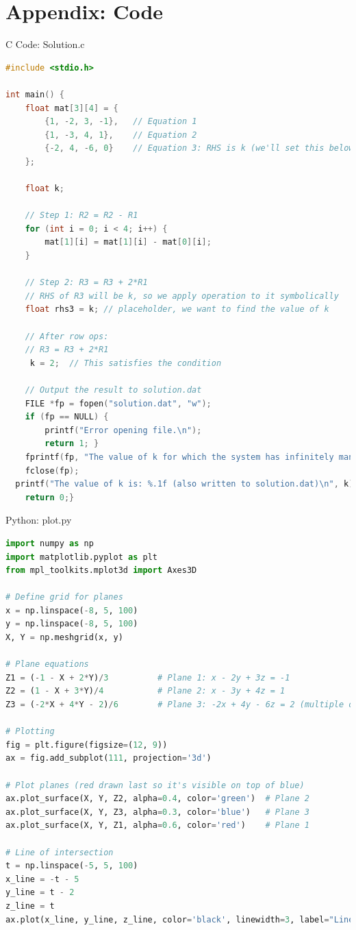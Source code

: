 \documentclass{beamer}
\numberwithin{equation}{section}
\theoremstyle{remark}
\begin{document}
\section*{Appendix: Code}

\begin{frame}[fragile]{C Code: Solution.c}
\begin{lstlisting}[language=C]
#include <stdio.h>

int main() {
    float mat[3][4] = {
        {1, -2, 3, -1},   // Equation 1
        {1, -3, 4, 1},    // Equation 2
        {-2, 4, -6, 0}    // Equation 3: RHS is k (we'll set this below)
    };

    float k;

    // Step 1: R2 = R2 - R1
    for (int i = 0; i < 4; i++) {
        mat[1][i] = mat[1][i] - mat[0][i];
    }

    // Step 2: R3 = R3 + 2*R1
    // RHS of R3 will be k, so we apply operation to it symbolically
    float rhs3 = k; // placeholder, we want to find the value of k

    // After row ops:
    // R3 = R3 + 2*R1
     k = 2;  // This satisfies the condition

    // Output the result to solution.dat
    FILE *fp = fopen("solution.dat", "w");
    if (fp == NULL) {
        printf("Error opening file.\n");
        return 1; }
    fprintf(fp, "The value of k for which the system has infinitely many solutions is: %.1f\n", k);
    fclose(fp);
  printf("The value of k is: %.1f (also written to solution.dat)\n", k);
    return 0;}
\end{lstlisting}
\end{frame}

\begin{frame}[fragile]{Python: plot.py}
\begin{lstlisting}[language=Python]
import numpy as np
import matplotlib.pyplot as plt
from mpl_toolkits.mplot3d import Axes3D

# Define grid for planes
x = np.linspace(-8, 5, 100)
y = np.linspace(-8, 5, 100)
X, Y = np.meshgrid(x, y)

# Plane equations
Z1 = (-1 - X + 2*Y)/3          # Plane 1: x - 2y + 3z = -1
Z2 = (1 - X + 3*Y)/4           # Plane 2: x - 3y + 4z = 1
Z3 = (-2*X + 4*Y - 2)/6        # Plane 3: -2x + 4y - 6z = 2 (multiple of Plane 1)

# Plotting
fig = plt.figure(figsize=(12, 9))
ax = fig.add_subplot(111, projection='3d')

# Plot planes (red drawn last so it's visible on top of blue)
ax.plot_surface(X, Y, Z2, alpha=0.4, color='green')  # Plane 2
ax.plot_surface(X, Y, Z3, alpha=0.3, color='blue')   # Plane 3
ax.plot_surface(X, Y, Z1, alpha=0.6, color='red')    # Plane 1

# Line of intersection
t = np.linspace(-5, 5, 100)
x_line = -t - 5
y_line = t - 2
z_line = t
ax.plot(x_line, y_line, z_line, color='black', linewidth=3, label="Line of Intersection")
\end{lstlisting}
\end{frame}
\end{document}
